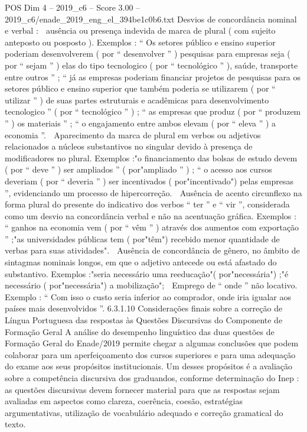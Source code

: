\begin{textsample}{POS Dim 4 – 2019\_c6 – Score 3.00 – 2019\_c6/enade\_2019\_eng\_el\_394be1c0b6.txt}
Desvios de concordância nominal e verbal :  ausência ou presença indevida de marca de plural ( com sujeito anteposto ou posposto ).
Exemplos : “ Os setores público e ensino superior poderiam desenvolverem ( por “ desenvolver ” ) pesquisas para empresas seja ( por “ sejam ” ) elas do tipo tecnologico ( por “ tecnológico ” ), saúde, transporte entre outros ” ; “ já as empresas poderiam financiar projetos de pesquisas para os setores público e ensino superior que também poderia se utilizarem ( por “ utilizar ” ) de suas partes estruturais e acadêmicas para desenvolvimento tecnologico ” ( por “ tecnológico ” ) ; “ as empresas que produz ( por “ produzem ” ) os materiais ” ; “ o engajamento entre ambos elevam ( por “ eleva ” ) a economia ”.  Aparecimento da marca de plural em verbos ou adjetivos relacionados a núcleos substantivos no singular devido à presença de modificadores no plural.
Exemplos :"o financiamento das bolsas de estudo devem ( por “ deve ” ) ser ampliados ” ( por"ampliado ” ) ; “ o acesso aos cursos deveriam ( por “ deveria ” ) ser incentivados ( por"incentivado") pelas empresas ”, evidenciando um processo de hipercorreção.  Ausência de acento circunflexo na forma plural do presente do indicativo dos verbos “ ter ” e “ vir ”, considerada como um desvio na concordância verbal e não na acentuação gráfica.
Exemplos : “ ganhos na economia vem ( por “ vêm ” ) através dos aumentos com exportação ” ;"as universidades públicas tem ( por"têm") recebido menor quantidade de verbas para suas atividades".  Ausência de concordância de gênero, no âmbito de sintagmas nominais longos, em que o adjetivo antecede ou está afastado do substantivo.
Exemplos :"seria necessário uma reeducação"( por"necessária") ;"é necessário ( por"necessária") a mobilização";  Emprego de “ onde ” não locativo.
Exemplo : “ Com isso o custo seria inferior ao comprador, onde iria igualar aos países mais desenvolvidos ”. 6.3.1.10 Considerações finais sobre a correção de Língua Portuguesa das respostas às Questões Discursivas do Componente de Formação Geral A análise do desempenho linguístico das duas questões de Formação Geral do Enade/2019 permite chegar a algumas conclusões que podem colaborar para um aperfeiçoamento dos cursos superiores e para uma adequação do exame aos seus propósitos institucionais.
Um desses propósitos é a avaliação sobre a competência discursiva dos graduandos, conforme determinação do Inep : as questões discursivas devem fornecer material para que as respostas sejam avaliadas em aspectos como clareza, coerência, coesão, estratégias argumentativas, utilização de vocabulário adequado e correção gramatical do texto.

\end{textsample}
